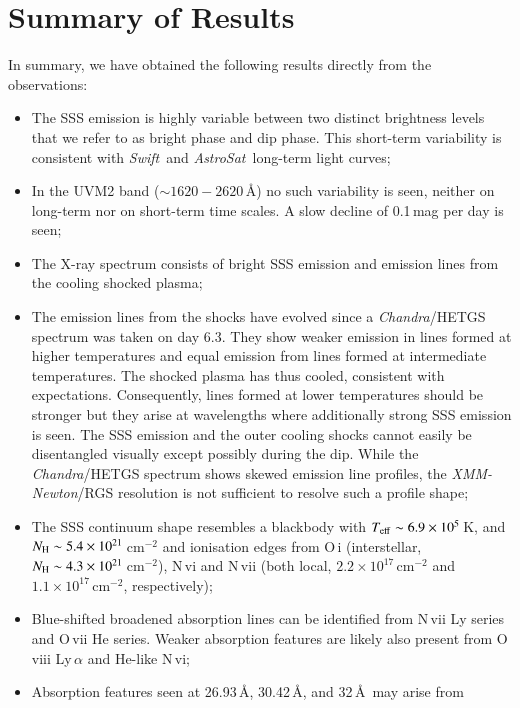 \documentclass{aa}
\newcommand{\chandra}{{\it Chandra}}
\newcommand{\swift}{{\it Swift}}
\newcommand{\xmm}{{\it XMM-Newton}}
\newcommand{\asat}{{\it AstroSat}}
\begin{document}
\section{Summary of Results}
\label{sect:results}

In summary, we have obtained the following results directly from the observations:
\begin{itemize}
 \item The SSS emission is highly variable between two distinct brightness levels that
 we refer to as bright phase and dip phase. This short-term variability is consistent
 with \swift\ and \asat\ long-term light curves;
 \item In the UVM2 band ($\sim 1620-2620$\,\AA) no such variability is seen,
 neither on long-term nor on short-term time scales. A slow decline of 0.1\,mag per
day is seen;
 \item The X-ray spectrum consists of bright SSS emission and emission lines from the cooling
   shocked plasma;
 \item The emission lines from the shocks have evolved since a \chandra/HETGS spectrum
  was taken on day 6.3. They show weaker emission in lines formed at higher
  temperatures and equal emission from lines formed at intermediate temperatures.
  The shocked plasma has thus cooled, consistent with expectations. Consequently,
  lines formed at lower temperatures should be stronger but they arise at wavelengths
  where additionally strong SSS emission is seen. The SSS emission and the outer cooling
  shocks cannot easily be disentangled visually except possibly during the dip.
  While the \chandra/HETGS spectrum shows skewed emission line profiles, the \xmm/RGS
  resolution is not sufficient to resolve such a profile shape;
 \item The SSS continuum shape resembles a blackbody with $T_{\rm eff}\sim 6.9\times 10^5$\,K,
  and $N_{\rm H}\sim 5.4\times 10^{21}$\,cm$^{-2}$ and ionisation edges from
   O\,{\sc i} (interstellar, $N_{\rm H}\sim
   4.3\times 10^{21}$\,cm$^{-2}$), N\,{\sc vi} and N\,{\sc vii} (both local,
   $2.2\times 10^{17}$\,cm$^{-2}$ and $1.1\times 10^{17}$\,cm$^{-2}$, respectively);
 \item Blue-shifted broadened absorption lines can be identified from N\,{\sc vii}
   Ly series and O\,{\sc vii} He series. Weaker absorption features are likely also
   present from O\,{\sc viii} Ly\,$\alpha$ and He-like N\,{\sc vi};
 \item Absorption features seen at 26.93\,\AA, 30.42\,\AA, and 32\,\AA\ may arise from

\end{itemize}
\end{document}
